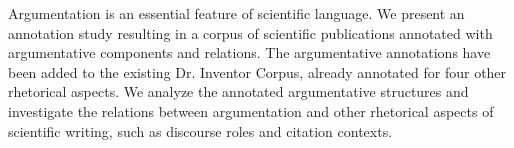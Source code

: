 Argumentation is an essential feature of scientific language. We present an annotation study resulting in a corpus of scientific publications annotated with argumentative components and relations. The argumentative annotations have been added to the existing Dr. Inventor Corpus, already annotated for four other rhetorical aspects. We analyze the annotated argumentative structures and investigate the relations between argumentation and other rhetorical aspects of scientific writing, such as discourse roles and citation contexts.
